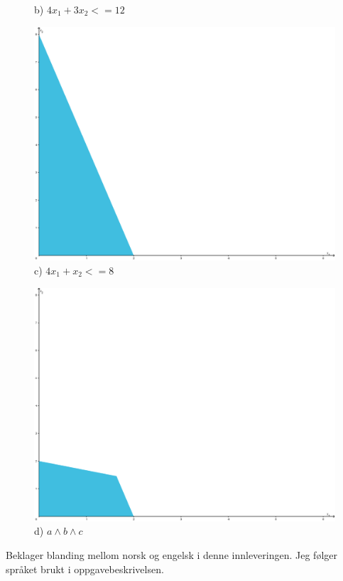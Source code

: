 \documentclass{article}
\begin{document}
\begin{figure}[ht]
\begin{minipage}{0.3\textwidth}
            \caption{b) $4x_1 + 3x_2 <= 12$}
        \end{minipage}\hfill
        \begin{minipage}{0.3\textwidth}
            \centering
            \includegraphics[width=\linewidth]{img/3.1-2c.PNG}
            \caption{c) $4x_1 + x_2 <= 8$}
        \end{minipage}
    \end{figure}
    
    \begin{figure}[ht]
        \centering
        \includegraphics[width=0.5\linewidth]{img/3.1-2d.PNG}
        \caption{d) $a \land b \land c$}
    \end{figure}

    Beklager blanding mellom norsk og engelsk i denne innleveringen. Jeg følger språket brukt i oppgavebeskrivelsen. 
    
\end{document}
